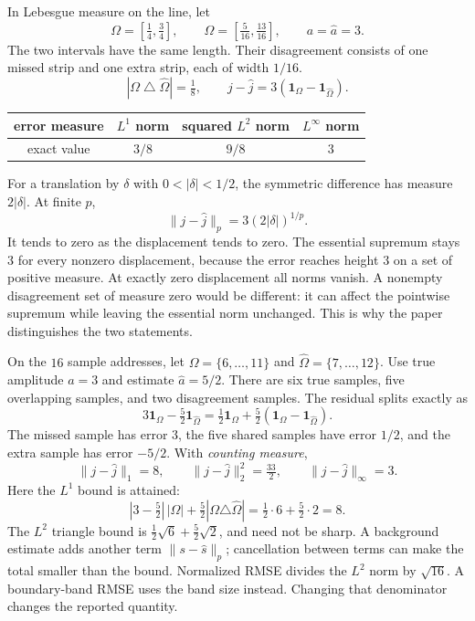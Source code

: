 In Lebesgue measure on the line, let
\[
\Omega=[\tfrac14,\tfrac34],\qquad
\widehat\Omega=[\tfrac5{16},\tfrac{13}{16}],\qquad a=\widehat a=3.
\]
The two intervals have the same length. Their disagreement consists of one missed strip and one extra strip, each of width $1/16$.
\[
|\Omega\mathbin{\triangle}\widehat\Omega|=\tfrac18,
\qquad j-\widehat j=3(\mathbf1_\Omega-\mathbf1_{\widehat\Omega}).
\]
\begin{center}
\begin{tabular}{c|ccc}
error measure & $L^1$ norm & squared $L^2$ norm & $L^\infty$ norm\\\hline
exact value & $3/8$ & $9/8$ & $3$
\end{tabular}
\end{center}
For a translation by $\delta$ with $0<|\delta|<1/2$, the symmetric difference has measure $2|\delta|$. At finite $p$,
\[
\|j-\widehat j\|_p=3(2|\delta|)^{1/p}.
\]
It tends to zero as the displacement tends to zero. The essential supremum stays $3$ for every nonzero displacement, because the error reaches height $3$ on a set of positive measure. At exactly zero displacement all norms vanish.
A nonempty disagreement set of measure zero would be different: it can affect the pointwise supremum while leaving the essential norm unchanged. This is why the paper distinguishes the two statements.

On the $16$ sample addresses, let $\Omega=\{6,\ldots,11\}$ and $\widehat\Omega=\{7,\ldots,12\}$. Use true amplitude $a=3$ and estimate $\widehat a=5/2$. There are six true samples, five overlapping samples, and two disagreement samples.
The residual splits exactly as
\[
3\mathbf1_\Omega-\tfrac52\mathbf1_{\widehat\Omega}
=\tfrac12\mathbf1_\Omega+\tfrac52(\mathbf1_\Omega-\mathbf1_{\widehat\Omega}).
\]
The missed sample has error $3$, the five shared samples have error $1/2$, and the extra sample has error $-5/2$. With \emph{counting measure},
\[
\|j-\widehat j\|_1=8,
\qquad \|j-\widehat j\|_2^2=\tfrac{33}{2},
\qquad \|j-\widehat j\|_\infty=3.
\]
Here the $L^1$ bound is attained:
\[
|3-\tfrac52|\,|\Omega|+\tfrac52|\Omega\triangle\widehat\Omega|
=\tfrac12\cdot6+\tfrac52\cdot2=8.
\]
The $L^2$ triangle bound is $\frac12\sqrt6+\frac52\sqrt2$, and need not be sharp. A background estimate adds another term $\|s-\widehat s\|_p$; cancellation between terms can make the total smaller than the bound.
Normalized RMSE divides the $L^2$ norm by $\sqrt{16}$. A boundary-band RMSE uses the band size instead. Changing that denominator changes the reported quantity.

